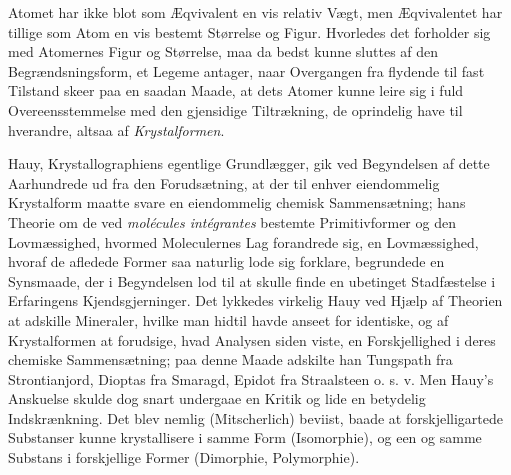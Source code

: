 \documentclass[12pt,a4paper]{book}
\begin{document}
Atomet har ikke blot som Æqvivalent en vis relativ
Vægt, men Æqvivalentet har tillige som Atom en vis bestemt
Størrelse og Figur. Hvorledes det forholder sig med
Atomernes Figur og Størrelse, maa da bedst kunne sluttes
af den Begrændsningsform, et Legeme antager, naar Overgangen
fra flydende til fast Tilstand skeer paa en saadan
Maade, at dets Atomer kunne leire sig i fuld Overeensstemmelse
med den gjensidige Tiltrækning, de oprindelig have
til hverandre, altsaa af \emph{Krystalformen}.

Hauy, Krystallographiens egentlige Grundlægger, gik ved
Begyndelsen af dette Aarhundrede ud fra den Forudsætning,
at der til enhver eiendommelig Krystalform maatte svare en
eiendommelig chemisk Sammensætning; hans Theorie om de
ved \textit{molécules intégrantes} bestemte Primitivformer og den
Lovmæssighed, hvormed Moleculernes Lag forandrede sig, en
Lovmæssighed, hvoraf de afledede Former saa naturlig lode
sig forklare, begrundede en Synsmaade, der i Begyndelsen
lod til at skulle finde en ubetinget Stadfæstelse i Erfaringens
Kjendsgjerninger. Det lykkedes virkelig Hauy ved Hjælp af
Theorien at adskille Mineraler, hvilke man hidtil havde anseet
for identiske, og af Krystalformen at forudsige, hvad Analysen
siden viste, en Forskjellighed i deres chemiske Sammensætning;
paa denne Maade adskilte han Tungspath fra Strontianjord,
Dioptas fra Smaragd, Epidot fra Straalsteen o. s. v. Men
Hauy's Anskuelse skulde dog snart undergaae en Kritik og
lide en betydelig Indskrænkning. Det blev nemlig (Mitscherlich)
beviist, baade at forskjelligartede Substanser kunne krystallisere
i samme Form (Isomorphie), og een og samme Substans
i forskjellige Former (Dimorphie, Polymorphie).
\end{document}
